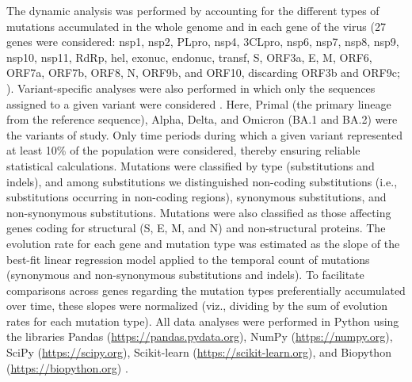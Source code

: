The dynamic analysis was performed by accounting for the different types of mutations accumulated in the whole genome and in each gene of the virus (27 genes were considered: nsp1, nsp2, PLpro, nsp4, 3CLpro, nsp6, nsp7, nsp8, nsp9, nsp10, nsp11, RdRp, hel, exonuc, endonuc, transf, S, ORF3a, E, M, ORF6, ORF7a, ORF7b, ORF8, N, ORF9b, and ORF10, discarding ORF3b and ORF9c; \cite{yang2021structural}). Variant-specific analyses were also performed in which only the sequences assigned to a given variant were considered \cite{neher2022contributions,goiriz2023variant}. Here, Primal (the primary lineage from the reference sequence), Alpha, Delta, and Omicron (BA.1 and BA.2) were the variants of study. Only time periods during which a given variant represented at least 10\% of the population were considered, thereby ensuring reliable statistical calculations. Mutations were classified by type (substitutions and indels), and among substitutions we distinguished non-coding substitutions (i.e., substitutions occurring in non-coding regions), synonymous substitutions, and non-synonymous substitutions. Mutations were also classified as those affecting genes coding for structural (S, E, M, and N) and non-structural proteins. The evolution rate for each gene and mutation type was estimated as the slope of the best-fit linear regression model applied to the temporal count of mutations (synonymous and non-synonymous substitutions and indels). To facilitate comparisons across genes regarding the mutation types preferentially accumulated over time, these slopes were normalized (viz., dividing by the sum of evolution rates for each mutation type). All data analyses were performed in Python using the libraries Pandas (\url{https://pandas.pydata.org}), NumPy (\url{https://numpy.org}), SciPy (\url{https://scipy.org}), Scikit-learn (\url{https://scikit-learn.org}), and Biopython (\url{https://biopython.org}) \cite{mckinney2012python,cock2009biopython}.

\vfill

\pagebreak



 

